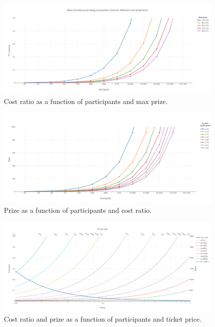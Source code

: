 \begin{figure}[htbp]
\label{fig:cost-ratio-chart}
  \centering
  \includegraphics[width=\columnwidth]{figures/max_participants_cost_ratio.png}
  \caption{Cost ratio as a function of participants and max prize.}
\end{figure}

\begin{figure}[htbp]
\label{fig:prize-chart}
  \centering
  \includegraphics[width=\columnwidth]{figures/max_participants_prize.png}
  \caption{Prize as a function of participants and cost ratio.}
\end{figure}

\begin{figure}[htbp]
\label{fig:price-chart}
  \centering
  \includegraphics[width=\columnwidth]{figures/ticket_prices.png}
  \caption{Cost ratio and prize as a function of participants and ticket price.}
\end{figure}
